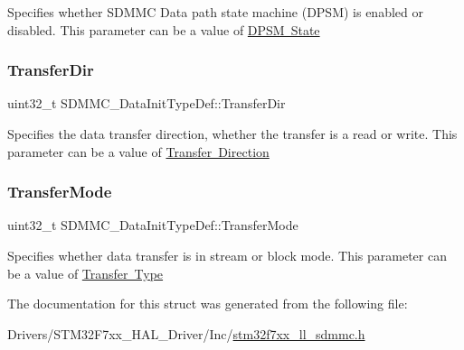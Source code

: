 Specifies whether S\+D\+M\+MC Data path state machine (D\+P\+SM) is enabled or disabled. This parameter can be a value of \mbox{\hyperlink{group___s_d_m_m_c___l_l___d_p_s_m___state}{D\+P\+SM State}} \mbox{\label{struct_s_d_m_m_c___data_init_type_def_a2063df8379a9d397d78178063bab6ec0}} 
\subsubsection{\texorpdfstring{TransferDir}{TransferDir}}
{\footnotesize\ttfamily uint32\+\_\+t S\+D\+M\+M\+C\+\_\+\+Data\+Init\+Type\+Def\+::\+Transfer\+Dir}

Specifies the data transfer direction, whether the transfer is a read or write. This parameter can be a value of \mbox{\hyperlink{group___s_d_m_m_c___l_l___transfer___direction}{Transfer Direction}} \mbox{\label{struct_s_d_m_m_c___data_init_type_def_a8e8508ca753fbdf33e72f0c01b5d4136}} 
\subsubsection{\texorpdfstring{TransferMode}{TransferMode}}
{\footnotesize\ttfamily uint32\+\_\+t S\+D\+M\+M\+C\+\_\+\+Data\+Init\+Type\+Def\+::\+Transfer\+Mode}

Specifies whether data transfer is in stream or block mode. This parameter can be a value of \mbox{\hyperlink{group___s_d_m_m_c___l_l___transfer___type}{Transfer Type}} 

The documentation for this struct was generated from the following file\+:\begin{DoxyCompactItemize}
\item 
Drivers/\+S\+T\+M32\+F7xx\+\_\+\+H\+A\+L\+\_\+\+Driver/\+Inc/\mbox{\hyperlink{stm32f7xx__ll__sdmmc_8h}{stm32f7xx\+\_\+ll\+\_\+sdmmc.\+h}}\end{DoxyCompactItemize}
